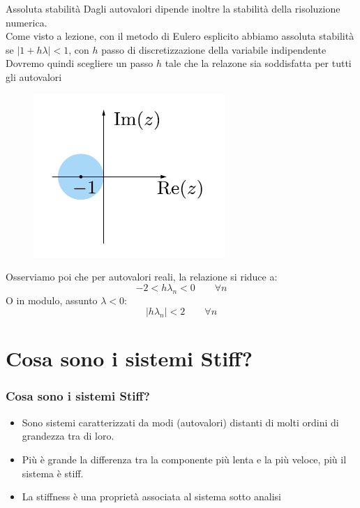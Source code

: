 \documentclass[aspectratio=169, 10pt, handout,usenames,dvipsnames]{beamer}
\begin{document}
    \begin{frame}{Assoluta stabilità}
        Dagli autovalori dipende inoltre la stabilità della risoluzione numerica.\\
        Come visto a lezione, con il metodo di Eulero esplicito abbiamo assoluta stabilità se \(|1+h\lambda| < 1\), con $h$ passo di discretizzazione della variabile indipendente\\
        Dovremo quindi scegliere un passo $h$ tale che la relazone sia soddisfatta per \alert{tutti} gli autovalori
        \medskip
        \begin{multicols}{2}
        \begin{figure}
        \centering
        \includegraphics[width=0.8\linewidth]{fig6.png}
        \label{fig:festability}
        \end{figure}
        \columnbreak
        \bigskip\bigskip
        Osserviamo poi che per autovalori reali, la relazione si riduce a: \large
        \[
        -2 < h \lambda_n < 0 \qquad \forall n
        \] \normalsize
        O in modulo, assunto $\lambda<0$: \large
        \[
        |h \lambda_n| < 2 \qquad \forall n
        \]
        \end{multicols}
        
    \end{frame}
    
\section{Cosa sono i sistemi Stiff?}\label{sec:sec3}
\begin{frame} \frametitle{Cosa sono i sistemi Stiff?}
    \begin{itemize}
        \item Sono sistemi caratterizzati da modi (autovalori) distanti di molti ordini di grandezza tra di loro. 
        \item Più è grande la differenza tra la componente più lenta e la più veloce, più il sistema è stiff.
        \item La stiffness è una proprietà associata al sistema sotto analisi
    \end{itemize}
\end{frame}
\end{document}
